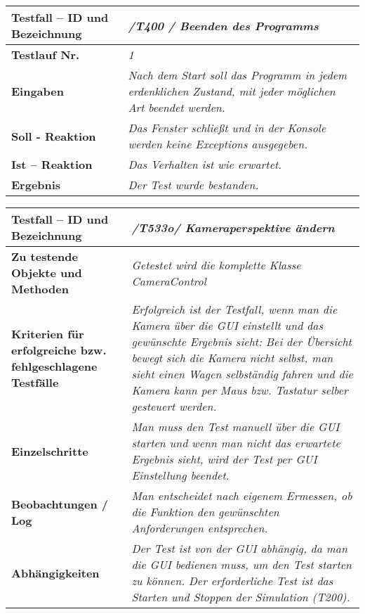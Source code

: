 \begin{longtable}{|p{7cm}|p{10cm}|}
\hline
\textbf{Testfall -- ID und Bezeichnung} & \textit{ /T400 / Beenden des Programms} \\
\hline
\textbf{Testlauf Nr.} & \textit{1} \\
\hline
\textbf{Eingaben} & \textit{Nach dem Start soll das Programm in jedem erdenklichen Zustand, mit jeder möglichen Art beendet werden.} \\
\hline
\textbf{Soll - Reaktion} & \textit{Das Fenster schließt und in der Konsole werden keine Exceptions ausgegeben.} \\
\hline
\textbf{Ist -- Reaktion} & \textit{Das Verhalten ist wie erwartet.} \\
\hline
\textbf{Ergebnis} & \textit{Der Test wurde bestanden.} \\
\hline
\end{longtable}

\begin{longtable}{|p{7cm}|p{10cm}|}
\hline
\textbf{Testfall -- ID und Bezeichnung} &  \textit{/T533o/ Kameraperspektive ändern} \\
\hline
\textbf{Zu testende Objekte und Methoden} &  \textit{Getestet wird die komplette Klasse CameraControl}
\\
\hline
\textbf{Kriterien für erfolgreiche bzw. fehlgeschlagene Testfälle} &
\textit{Erfolgreich ist der Testfall, wenn man die Kamera über die GUI einstellt und das gewünschte Ergebnis sieht: Bei der Übersicht bewegt sich die Kamera nicht selbst, man sieht einen Wagen selbständig fahren und die Kamera kann per Maus bzw. Tastatur selber gesteuert werden. } \\
\hline
\textbf{Einzelschritte} &  \textit{Man muss den Test manuell über die GUI starten und wenn man nicht das erwartete Ergebnis sieht, wird der Test per GUI Einstellung beendet.} \\
\hline
\textbf{Beobachtungen / Log} &  \textit{Man entscheidet nach eigenem Ermessen, ob die Funktion den gewünschten Anforderungen entsprechen.} \\
\hline
\textbf{Abhängigkeiten} &  \textit{Der Test ist von der GUI abhängig, da man die GUI bedienen muss, um den Test starten zu können. Der erforderliche Test ist das Starten und Stoppen der Simulation (T200).} \\
\hline
\end{longtable}

